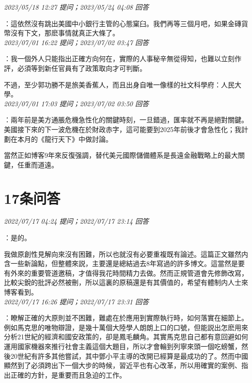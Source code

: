 \documentclass[twocolumn]{ctexart}
\begin{document}
\textit{\hfill\noindent\small 2023/05/18 12:27 提问；2023/05/24 04:08 回答}

：這依然沒有跳出美國中小銀行主管的心態窠臼。我們再等三個月吧，如果金磚貨幣沒有下文，那麽事情就真正大條了。
\\

\textit{\hfill\noindent\small 2023/07/01 16:22 提问；2023/07/02 03:47 回答}

：我一個外人只能指出正確方向何在，實際的人事秘辛無從得知，也難以立刻作評，必須等到新任官員有了政策取向才可判斷。

不過，至少郭功勝不是旅美香蕉人，而且出身自唯一像樣的社文科學府：人民大學。
\\

\textit{\hfill\noindent\small 2023/07/01 17:03 提问；2023/07/02 03:50 回答}

：兩年前是美方通脹危機急性化的關鍵時刻，一旦錯過，匯率就不再是絕對關鍵。美國接下來的下一波危機在於財政赤字，這可能要到2025年前後才會急性化；我計劃在本月的《龍行天下》中做討論。

當然正如博客9年來反復强調，替代美元國際儲備體系是長遠金融戰略上的最大關鍵，任重而道遠。
\\

\section{17条问答}

\textit{\hfill\noindent\small 2022/07/17 04:24 提问；2022/07/17 23:14 回答}

：是的。

我做原創性見解向來沒有困難，所以也就沒有必要重複既有論述。這篇正文雖然内含一些新論點，但整體來説，主要還是總結過去8年寫過的許多博文。這當然是要有外來的重要管道邀稿，才值得我花時間精力去做。然而正規管道會先修飾改寫，比較尖銳的批評必然被刪，所以這裏的原稿還是有其價值的，希望有體制内人士來博客看到。
\\

\textit{\hfill\noindent\small 2022/07/17 16:26 提问；2022/07/17 23:31 回答}

：瞭解正確的大原則並不困難，難處在於應用到實際執行時，如何落實在細節上。例如馬克思的唯物辯證，是幾十萬個大陸學人朗朗上口的口號，但能説出怎麽用來分析21世紀的經濟和國安政策的，卻是鳳毛麟角。其實馬克思自己都有意回避如何運用國家機器來推行社會主義這個大題目，所以才會輪到列寧來頭一個吃螃蟹，然後20世紀有許多其他嘗試，其中鄧小平主導的改開已經算是最成功的了。然而中國顯然到了必須跨出下一個大步的時候，習近平也有心改革，所以用確實的案例、指出正確的方針，是重要而且急迫的工作。
\\
\end{document}
